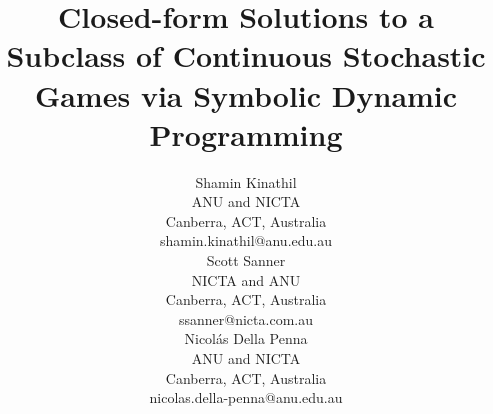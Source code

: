 \title{Closed-form Solutions to a Subclass of Continuous Stochastic Games via Symbolic Dynamic Programming}

\author{Shamin Kinathil \\
ANU and NICTA \\
Canberra, ACT, Australia \\
shamin.kinathil@anu.edu.au \\
\And
Scott Sanner  \\
NICTA and ANU \\
Canberra, ACT, Australia \\
ssanner@nicta.com.au \\
\And
Nicol\'{a}s Della Penna \\
ANU and NICTA \\
Canberra, ACT, Australia \\
nicolas.della-penna@anu.edu.au \\
}

\maketitle